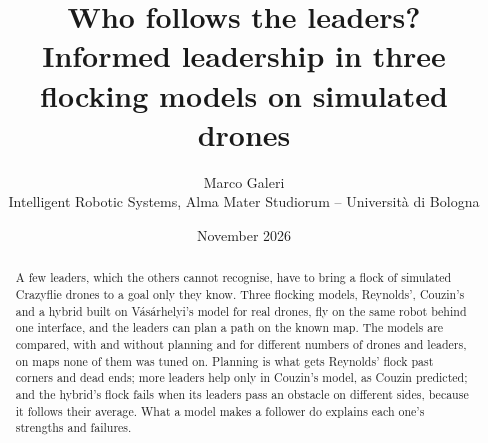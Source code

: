 \documentclass[11pt,a4paper]{article}
\title{Who follows the leaders?\\
  Informed leadership in three flocking models on simulated drones}
\author{Marco Galeri\\
  \small Intelligent Robotic Systems, Alma Mater Studiorum -- Università di Bologna}
\date{November 2026}
\begin{document}
\maketitle

\begin{abstract}
  A few leaders, which the others cannot recognise, have to bring a flock of
  simulated Crazyflie drones to a goal only they know. Three flocking models,
  Reynolds', Couzin's and a hybrid built on Vásárhelyi's model for real
  drones, fly on the same robot behind one interface, and the leaders can
  plan a path on the known map. The models are compared, with and without
  planning and for different numbers of drones and leaders, on maps none of
  them was tuned on. Planning is what gets Reynolds' flock past corners and
  dead ends; more leaders help only in Couzin's model, as Couzin predicted;
  and the hybrid's flock fails when its leaders pass an obstacle on
  different sides, because it follows their average. What a model makes a
  follower do explains each one's strengths and failures.
\end{abstract}












\appendix

\end{document}
